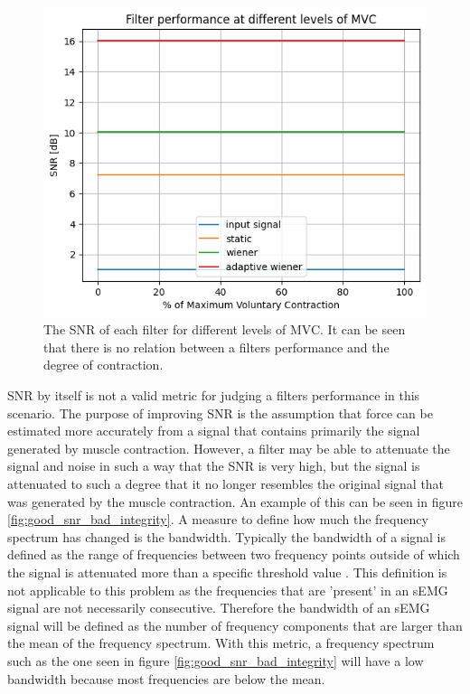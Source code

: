 \begin{figure}[h!t]
	\begin{center}
		\includegraphics[width=0.7\columnwidth]{images/filter_snr_mvc.png}
	\end{center}
	\caption{The SNR of each filter for different levels of MVC. It can be seen that there is no relation between a filters performance and the degree of contraction.}
	\label{fig:filter_snr_mvc}
\end{figure}

SNR by itself is not a valid metric for judging a filters performance in this scenario. The purpose of improving SNR is the assumption that force can be estimated more accurately from a signal that contains primarily the signal generated by muscle contraction. However, a filter may be able to attenuate the signal and noise in such a way that the SNR is very high, but the signal is attenuated to such a degree that it no longer resembles the original signal that was generated by the muscle contraction. An example of this can be seen in figure \ref{fig:good_snr_bad_integrity}. A measure to define how much the frequency spectrum has changed is the bandwidth. Typically the bandwidth of a signal is defined as the range of frequencies between two frequency points outside of which the signal is attenuated more than a specific threshold value \cite{bandwidth_definition}. This definition is not applicable to this problem as the frequencies that are 'present' in an sEMG signal are not necessarily consecutive. Therefore the bandwidth of an sEMG signal will be defined as the number of frequency components that are larger than the mean of the frequency spectrum. With this metric, a frequency spectrum such as the one seen in figure \ref{fig:good_snr_bad_integrity} will have a low bandwidth because most frequencies are below the mean.

